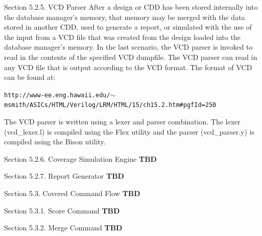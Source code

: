 \begin{Desc}
\item[Section 5.2.5. VCD Parser]After a design or CDD has been stored internally into the database manager's memory, that memory may be merged with the data stored in another CDD, used to generate a report, or simulated with the use of the input from a VCD file that was created from the design loaded into the database manager's memory. In the last scenario, the VCD parser is invoked to read in the contents of the specified VCD dumpfile. The VCD parser can read in any VCD file that is output according to the VCD format. The format of VCD can be found at:\end{Desc}
\begin{Desc}
\item[]{\tt http://www-ee.eng.hawaii.edu/$\sim$msmith/ASICs/HTML/Verilog/LRM/HTML/15/ch15.2.htm\#pgf\-Id=250}\end{Desc}
\begin{Desc}
\item[]The VCD parser is written using a lexer and parser combination. The lexer (vcd\_\-lexer.l) is compiled using the Flex utility and the parser (vcd\_\-parser.y) is compiled using the Bison utility.\end{Desc}




\begin{Desc}
\item[Section 5.2.6. Coverage Simulation Engine]{\bf TBD}  \end{Desc}




\begin{Desc}
\item[Section 5.2.7. Report Generator]{\bf TBD}  \end{Desc}




\begin{Desc}
\item[Section 5.3. Covered Command Flow]{\bf TBD}  \end{Desc}
\begin{Desc}
\item[Section 5.3.1. Score Command]{\bf TBD}  \end{Desc}




\begin{Desc}
\item[Section 5.3.2. Merge Command]{\bf TBD}  \end{Desc}




